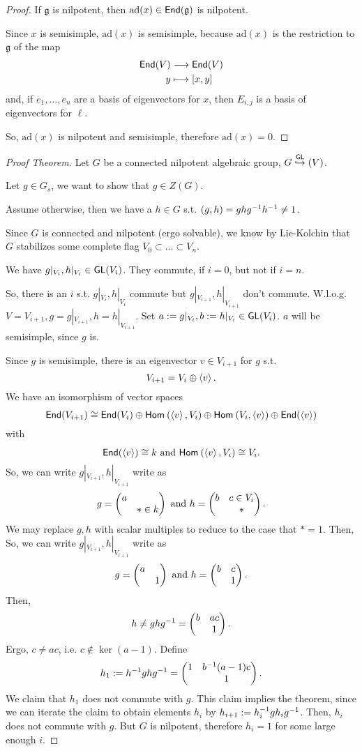 \begin{proof}
If $\mathfrak{g}$ is nilpotent, then $\mathrm{ad}(x) \in \textsf{End}(\mathfrak{g})$ is nilpotent.

Since $x$ is semisimple, $\mathrm{ad}(x)$ is semisimple, because $\mathrm{ad}(x)$ is the restriction to $\mathfrak{g}$ of the map
\begin{align*}
\textsf{End}(V) & \overset{}{\longrightarrow} \textsf{End}(V)\\
y & \longmapsto [x,y]
\end{align*}
and, if $e_1, \ldots, e_n$ are a basis of eigenvectors for $x$, then $E_{i,j}$ is a basis of eigenvectors for $\ell$.

So, $\mathrm{ad}(x)$ is nilpotent and semisimple, therefore $\mathrm{ad}(x) = 0$.
\end{proof}

\begin{proof}[Proof Theorem]
	Let $G$ be a connected nilpotent algebraic group, $G \overset{\textsf{GL}}{\hookrightarrow}(V)$.
	
	Let $g \in G_s$, we want to show that $g \in Z(G)$.
	
	Assume otherwise, then we have a $h \in G$ s.t. $(g,h) = ghg^{-1} h^{-1} \neq 1$.
	
	Since $G$ is connected and nilpotent (ergo solvable), we know by Lie-Kolchin that $G$ stabilizes some complete flag $V_0 \subset \ldots \subset V_n$.
	
	We have $g|_{V_i}, h|_{V_i} \in \textsf{GL}(V_i)$. They commute, if $i = 0$, but not if $i = n$.
	
	So, there is an $i$ s.t. $g|_{V_i}, h|_{V_i}$ commute but  $g|_{V_{i+1}}, h|_{V_{i+1}}$ don't commute. W.l.o.g. $V =V_{i+1}, g = g|_{V_{i+1}}, h = h|_{V_{i+1}}$.
	Set $a:= g|_{V_i}, b:=  h|_{V_i} \in \textsf{GL}(V_i)$. $a$ will be semisimple, since $g$ is.
	
	Since $g$ is semisimple, there is an eigenvector $v \in V_{i+1}$ for $g$ s.t.
	\[ V_{i+1} = V_i \oplus \left<v\right>. \]
	We have an isomorphism of vector spaces
	\[ \textsf{End}(V_{i+1}) \overset{}{\cong} \textsf{End}(V_i) \oplus \textsf{Hom}_{}\left(\left<v\right>, V_i\right) \oplus \textsf{Hom}_{}\left(V_i, \left<v\right>\right) \oplus \textsf{End}(\left<v\right>) \]
	with
	\[ \textsf{End}(\left<v\right>) \overset{}{\cong} k \text{  and  } \textsf{Hom}_{}\left(\left<v\right>, V_i\right) \overset{}{\cong} V_i. \]
	So, we can write $ g|_{V_{i+1}},   h|_{V_{i+1}}$ write as
	\[
	g = \left(\begin{matrix} a \\ & * \in k \end{matrix}\right) \text{  and  } 	h = \left(\begin{matrix} b & c \in V_i \\ & *  \end{matrix}\right).
	\]
	We may replace $g,h$ with scalar multiples to reduce to the case that $* = 1$. Then,
		So, we can write $ g|_{V_{i+1}},   h|_{V_{i+1}}$ write as
	\[
	g = \left(\begin{matrix} a \\ & 1 \end{matrix}\right) \text{  and  } 	h = \left(\begin{matrix} b & c  \\ & 1  \end{matrix}\right).
	\]
	Then,
	\[ h\neq ghg^{-1} = \left(\begin{matrix} b & ac \\ & 1 \end{matrix}\right). \]
	Ergo, $c \neq ac$, i.e. $c \notin \ker(a -1)$. Define
	\[ h_1:= h^{-1} gh g^{-1} = \left(\begin{matrix} 
	1 & b^{-1}(a-1)c\\ & 1 \end{matrix}\right). \]
We claim that $h_1$ does not commute with $g$. This claim implies the theorem, since we can iterate the claim to obtain elements $h_i$ by $h_{i+1} := h_i^{-1} g h_i g^{-1}$. Then, $h_i$ does not commute with $g$. But $G$ is nilpotent, therefore $h_i = 1$ for some large enough $i$.


\end{proof}
